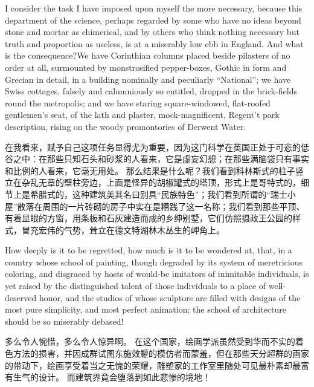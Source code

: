\documentclass[cs4size, a4paper, 12pt]{article}
\newcounter{numpar}
\newcommand*{\newpar}{\numpar{}}
\begin{document}
	\newpar I consider the task I have imposed upon myself the more necessary, because this department of the science, perhaps regarded by some who have no ideas beyond stone and mortar as chimerical, and by others who think nothing necessary but truth and proportion as useless, is at a miserably low ebb in England. And what is the consequence?We have Corinthian columns placed beside pilasters of no order at all, surmounted by monstrosified pepper-boxes, Gothic in form and Grecian in detail, in a building nominally and peculiarly ``National''; we have Swiss cottages, falsely and calumniously so entitled, dropped in the brick-fields round the metropolis; and we have staring square-windowed, flat-roofed gentlemen’s seat, of the lath and plaster, mock-magnificent, Regent’t park description, rising on the woody promontories of Derwent Water.
	
	在我看来，赋予自己这项任务显得尤为重要，因为这门科学在英国正处于可悲的低谷之中：在那些只知石头和砂浆的人看来，它是虚妄幻想；在那些满脑袋只有事实和比例的人看来，它毫无用处。 那么结果是什么呢？我们看到科林斯式的柱子竖立在杂乱无章的壁柱旁边，上面是怪异的胡椒罐式的塔顶，形式上是哥特式的，细节上是希腊式的，这种建筑美其名曰别具``民族特色''；我们看到所谓的``瑞士小屋''散落在周围的一片砖砌的房子中实在是糟践了这一名称；我们看到那些平顶、有着显眼的方窗，用条板和石灰建造而成的乡绅别墅，它们仿照摄政王公园的样式，冒充宏伟的气势，耸立在德文特湖林木丛生的岬角上。 
	
	\newpar How deeply is it to be regretted, how much is it to be wondered at, that, in a country whose school of painting, though degraded by its system of meretricious coloring, and disgraced by hosts of would-be imitators of inimitable individuals, is yet raised by the distinguished talent of those individuals to a place of well-deserved honor, and the studios of whose sculptors are filled with designs of the most pure simplicity, and most perfect animation; the school of architecture should be so miserably debased!
	
	多么令人惋惜，多么令人惊异啊。 在这个国家，绘画学派虽然受到华而不实的着色方法的损害，并因成群试图东施效颦的模仿者而蒙羞，但在那些天分超群的画家的带动下，绘画享受着当之无愧的荣耀，雕塑家的工作室里随处可见最朴素却最富有生气的设计。  而建筑界竟会堕落到如此悲惨的境地！
	
\end{document}
